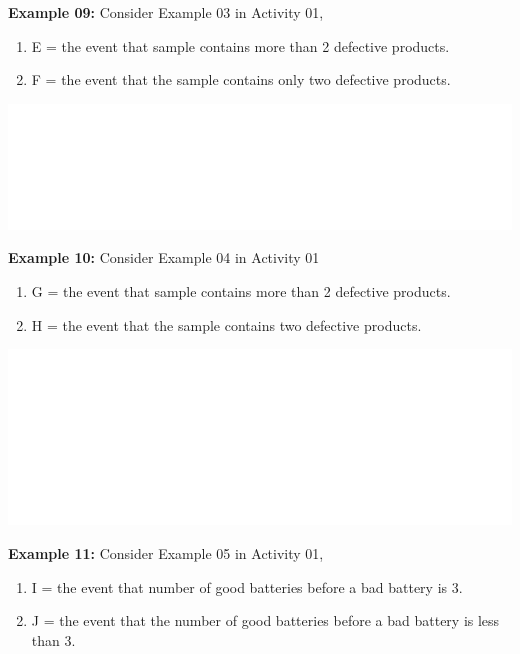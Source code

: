 \documentclass[]{book}
\providecommand{\tightlist}{%
  \setlength{\itemsep}{0pt}\setlength{\parskip}{0pt}}
\begin{document}
\textbf{Example 09:} Consider Example 03 in Activity 01,

\begin{enumerate}
\def\labelenumi{\alph{enumi})}
\tightlist
\item
  E = the event that sample contains more than 2 defective products.
\item
  F = the event that the sample contains only two defective products.
\end{enumerate}

\begin{center}\includegraphics[width=1\linewidth]{figure/box72c-1} \end{center}

\textbf{Example 10:} Consider Example 04 in Activity 01

\begin{enumerate}
\def\labelenumi{\alph{enumi})}
\tightlist
\item
  G = the event that sample contains more than 2 defective products.
\item
  H = the event that the sample contains two defective products.
\end{enumerate}

\begin{center}\includegraphics[width=1\linewidth]{figure/box72d-1} \end{center}

\textbf{Example 11:} Consider Example 05 in Activity 01,

\begin{enumerate}
\def\labelenumi{\alph{enumi})}
\tightlist
\item
  I = the event that number of good batteries before a bad battery is 3.
\item
  J = the event that the number of good batteries before a bad battery is less than 3.
\end{enumerate}
\end{document}
